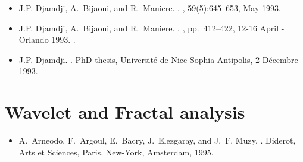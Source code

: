 \begin{itemize}
\item J.P. Djamdji, A.~Bijaoui, and R.~Maniere.
.
,
  59(5):645--653, May 1993.

\item  J.P. Djamdji, A.~Bijaoui, and R.~Maniere.
.
, pp.\ 412--422, {12-16 April - Orlando} 1993.
.

\item J.P. Djamdji.
.
\newblock PhD thesis, {Universit\'e de Nice Sophia Antipolis}, {2 D\'ecembre}
  1993.
\end{itemize}

 \section{Wavelet and Fractal analysis}
\begin{itemize}
\item A.~Arneodo, F.~Argoul, E.~Bacry, J.~Elezgaray, and J.~F. Muzy.
.
\newblock Diderot, Arts et Sciences, Paris, New-York, Amsterdam, 1995.
\end{itemize}


